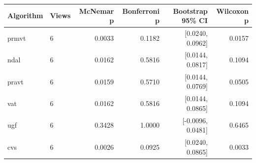 \begin{tabular}{llrrrr}
\hline
Algorithm & Views & McNemar p & Bonferroni p & Bootstrap 95\% CI & Wilcoxon p \\
\hline
prmvt & 6 & 0.0033 & 0.1182 & [0.0240, 0.0962] & 0.0157 \\
ndal & 6 & 0.0162 & 0.5816 & [0.0144, 0.0817] & 0.1094 \\
pravt & 6 & 0.0159 & 0.5710 & [0.0144, 0.0769] & 0.0505 \\
vat & 6 & 0.0162 & 0.5816 & [0.0144, 0.0865] & 0.1094 \\
ugf & 6 & 0.3428 & 1.0000 & [-0.0096, 0.0481] & 0.6465 \\
cvs & 6 & 0.0026 & 0.0925 & [0.0240, 0.0865] & 0.0033 \\
\hline
\end{tabular}

